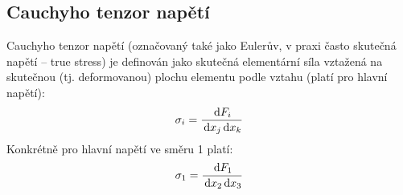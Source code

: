 
\subsection{Cauchyho tenzor napětí}
Cauchyho tenzor napětí (označovaný také jako Eulerův, v praxi často skutečná napětí -- true stress) je definován jako skutečná elementární síla vztažená na skutečnou (tj. deformovanou) plochu elementu podle vztahu (platí pro hlavní napětí):
\begin{equation}
	\sigma_i = \frac{\,\mathrm{d} F_i}{\,\mathrm{d} x_j \,\mathrm{d} x_k}
\end{equation}
Konkrétně pro hlavní napětí ve směru 1 platí:
\begin{equation}
	\sigma_1 = \frac{\,\mathrm{d} F_1}{\,\mathrm{d} x_2 \,\mathrm{d} x_3}
\end{equation}
